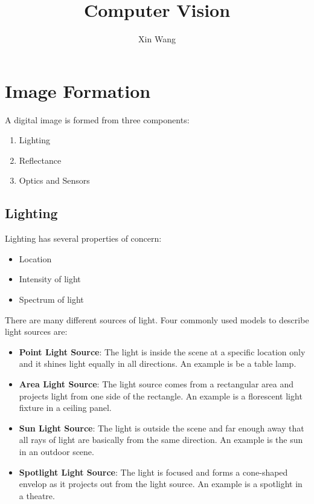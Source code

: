 \documentclass{report}
\title{Computer Vision}
\author{Xin Wang}
\begin{document}
\par
\maketitle
\medskip

\tableofcontents

\chapter{Image Formation}

A digital image is formed from three components:
\begin{enumerate}
    \item Lighting 
    \item Reflectance 
    \item Optics and Sensors
\end{enumerate} 

\section{Lighting}

Lighting has several properties of concern:
\begin{itemize}
    \item Location 
    \item Intensity of light 
    \item Spectrum of light
\end{itemize} 

There are many different sources of light. Four commonly used models to describe
light sources are:
\begin{itemize}
    \item \textbf{Point Light Source}: The light is inside the scene at a
    specific location only and it shines light equally in all directions. An example
    is be a table lamp.
    \item \textbf{Area Light Source}: The light source comes from a rectangular
    area and projects light from one side of the rectangle. An example is a
    florescent light fixture in a ceiling panel. 
    \item \textbf{Sun Light Source}: The light is outside the scene and far
    enough away that all rays of light are basically from the same direction. 
    An example is the sun in an outdoor scene.
    \item \textbf{Spotlight Light Source}: The light is focused and forms a
    cone-shaped envelop as it projects out from the light source. An example is
    a spotlight in a theatre. 
\end{itemize}
\end{document}
